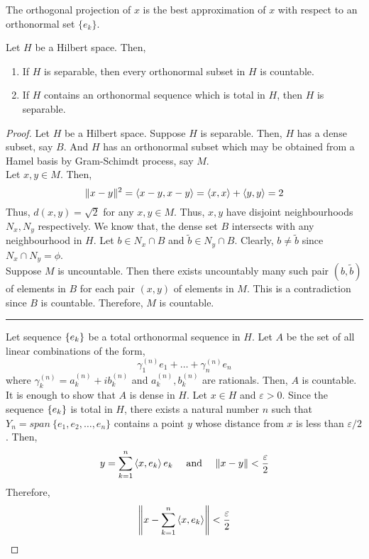\begin{commentary}
\begin{definition}
	The orthogonal projection of $x$ is the best approximation of $x$ with respect to an orthonormal set $\{e_k\}$.
\end{definition}
\end{commentary}

\begin{theorem}
	Let $H$ be a Hilbert space.
	Then,
	\begin{enumerate}
		\item If $H$ is separable, then every orthonormal subset in $H$ is countable.
		\item If $H$ contains an orthonormal sequence which is total in $H$, then $H$ is separable.
	\end{enumerate}
\end{theorem}
\begin{proof}
	Let $H$ be a Hilbert space.
	Suppose $H$ is separable.
	Then, $H$ has a dense subset, say $B$.
	And $H$ has an orthonormal subset which may be obtained from a Hamel basis by Gram-Schimdt process, say $M$.\\
	
	Let $x,y \in M$.
	Then,
	\[ \|x-y\|^2 = \left\langle x-y,x-y \right\rangle = \left\langle x,x \right\rangle + \left\langle y,y \right\rangle = 2 \]
	Thus, $d(x,y) = \sqrt{2}$ for any $x,y \in M$.
	Thus, $x,y$ have disjoint neighbourhoods $N_x,N_y$ respectively.
	We know that, the dense set $B$ intersects with any neighbourhood in $H$.
	Let $b \in N_x \cap B$ and $\tilde{b} \in N_y \cap B$.
	Clearly, $b \ne \tilde{b}$ since $N_x \cap N_y = \phi$.\\

	Suppose $M$ is uncountable.
	Then there exists uncountably many such pair $(b,\tilde{b})$ of elements in $B$ for each pair $(x,y)$ of elements in $M$.
	This is a contradiction since $B$ is countable.
	Therefore, $M$ is countable.\\

	\hrule \vspace{1em}

	Let sequence $\left\{e_k\right\}$ be a total orthonormal sequence in $H$.
	Let $A$ be the set of all linear combinations of the form,
	\[ \gamma_1^{(n)}e_1 + \dots + \gamma_n^{(n)}e_n  \]
	where $\gamma_k^{(n)} = a_k^{(n)} + ib_k^{(n)}$ and $a_k^{(n)},b_k^{(n)}$ are rationals.
	Then, $A$ is countable.\\

	It is enough to show that $A$ is dense in $H$.
	Let $x \in H$ and $\varepsilon > 0$.
	Since the sequence $\left\{e_k\right\}$ is total in $H$, there exists a natural number $n$ such that $Y_n = span\ \{e_1,e_2,\dots,e_n\}$ contains a point $y$ whose distance from $x$ is less than $\varepsilon/2$.
	Then, 
	\[ y = \sum_{k=1}^n \left\langle x,e_k \right\rangle e_k \quad \text{ and } \quad \| x-y \| < \frac{\varepsilon}{2} \]
	Therefore,
	\[ \left\| x - \sum_{k=1}^n \left\langle x,e_k \right\rangle \right\| < \frac{\varepsilon}{2} \]
\end{proof}

